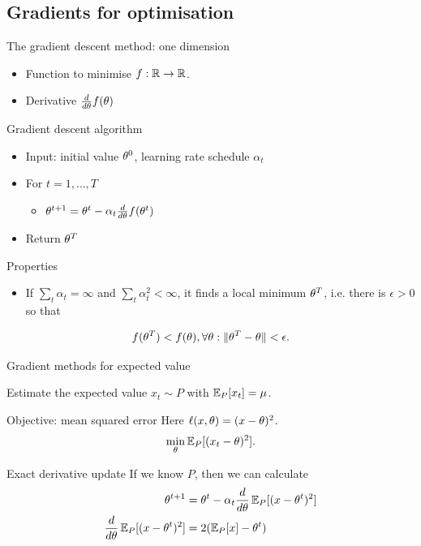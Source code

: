 \documentclass[smaller]{beamer}
\begin{document}
\subsection{Gradients for optimisation}
\label{sec:orgeb1341d}
\begin{frame}[label={sec:org5f36401}]{The gradient descent method: one dimension}
\begin{itemize}
\item Function to minimise \(f : \mathbb{R} \to \mathbb{R}\).
\item Derivative \(\frac{d}{d \theta} f(\theta)\)
\end{itemize}
\pause
\begin{block}{Gradient descent algorithm}
\begin{itemize}
\item Input: initial value \(\theta^0\), \alert{learning rate} schedule \(\alpha_t\)
\item For \(t=1, \ldots, T\)
\begin{itemize}
\item \(\theta^{t+1} = \theta^t - \alpha_t \frac{d}{d \theta} f(\theta^t)\)
\end{itemize}
\item Return \(\theta^T\)
\end{itemize}
\pause
\end{block}
\begin{block}{Properties}
\begin{itemize}
\item If \(\sum_t \alpha_t = \infty\) and \(\sum_t \alpha_t^2 < \infty\), it finds a local minimum \(\theta^T\), i.e. there is \(\epsilon > 0\) so that
\end{itemize}
\[
f(\theta^T) < f(\theta), \forall \theta: \|\theta^T - \theta\| < \epsilon.
\]
\end{block}
\end{frame}
\begin{frame}[label={sec:org4dfab48}]{Gradient methods for expected value}
\begin{block}{Estimate the expected value}
\(x_t \sim P\) with \(\mathop{\mbox{\ensuremath{\mathbb{E}}}}\nolimits_P[x_t] = \mu\).
\pause
\end{block}
\begin{block}{Objective: mean squared error}
Here \(\ell(x, \theta) = (x - \theta)^2\).
\[
\min_\theta \mathop{\mbox{\ensuremath{\mathbb{E}}}}\nolimits_P[(x_t - \theta)^2].
\]
\pause
\end{block}
\begin{block}{Exact derivative update}
If we know \(P\), then we can calculate
\begin{align}
\theta^{t+1} &= \theta^t - \alpha_t \frac{d}{d\theta} \mathop{\mbox{\ensuremath{\mathbb{E}}}}\nolimits_P[(x - \theta^t)^2]\\
\frac{d}{d\theta} \mathop{\mbox{\ensuremath{\mathbb{E}}}}\nolimits_P[(x - \theta^t)^2] &= 2 (\mathop{\mbox{\ensuremath{\mathbb{E}}}}\nolimits_P[x] - \theta^t)
\end{align}
\end{block}
\end{frame}
\end{document}
